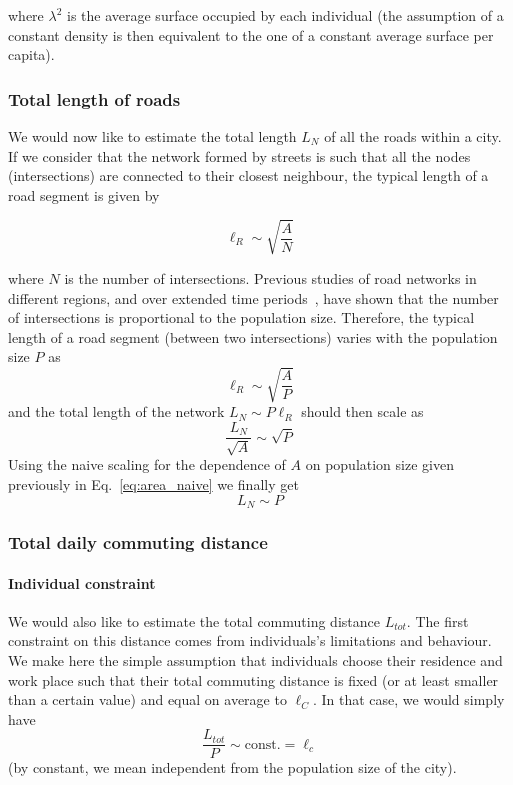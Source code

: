 where $\lambda^2$ is the average surface occupied by each individual (the assumption of a constant density is then equivalent to the one of a constant average surface per capita).

\subsubsection{Total length of roads} 

We would now like to estimate the total length $L_N$ of all the roads within a city. If we consider that the network formed by streets is such that all the nodes (intersections) are connected to their closest neighbour, the typical length of a road segment is given by

\begin{equation}
\ell_R \sim \sqrt{\frac{A}{N}}
\end{equation}

where $N$ is the number of intersections. Previous studies of road networks in different regions, and over extended time periods~\cite{Strano:2012,Barthelemy:2013}, have shown that the number of intersections is proportional to the population size. Therefore, the typical length of a road segment (between two intersections) varies with the population size $P$ as
%
\begin{equation}
\ell_R \sim \sqrt{\frac{A}{P}}
\end{equation}
%
and the total length of the network $L_N \sim P\ell_R$ should then scale as
%
\begin{equation}
\frac{L_N}{\sqrt{A}}\sim\sqrt{P}
\end{equation}
%
Using the naive scaling for the dependence of $A$ on population size given previously in Eq.~\ref{eq:area_naive} we finally get
\begin{equation}
L_N \sim P
\end{equation}


\subsubsection{Total daily commuting distance} 

\paragraph{Individual constraint} We would also like to estimate the total commuting distance $L_{tot}$. The first constraint on this distance comes from individuals's limitations and behaviour. We make here the simple assumption that individuals choose their residence and work place such that their total commuting distance is fixed (or at least smaller than a certain value) and equal on average to $\ell_C$. In that case, we would simply have
%
\begin{equation}
  \frac{L_{tot}}{P} \sim \text{const.} = \ell_c
\label{eq:assum}
\end{equation}
(by constant, we mean independent from the population size of the city).

